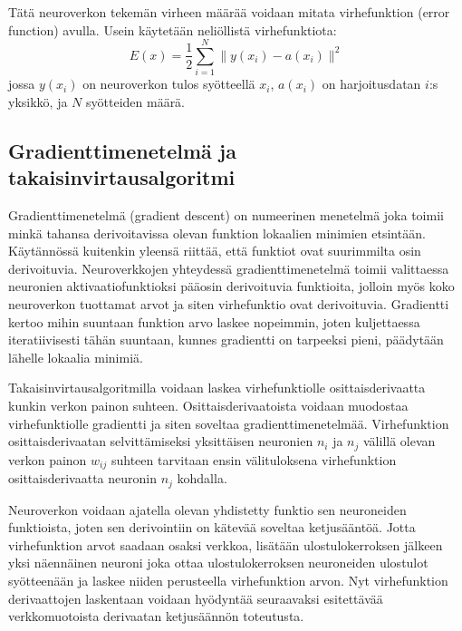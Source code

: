 \documentclass[finnish]{tktltiki2}
\theoremstyle{definition}
\theoremstyle{remark}
\begin{document}
  Tätä neuroverkon tekemän virheen määrää voidaan mitata virhefunktion (error function) avulla. Usein käytetään neliöllistä virhefunktiota:
    $$E(x) = \frac{1}{2} \sum_{i=1}^{N} \| y(x_i)-a(x_i) \|^2$$
  jossa $y(x_i)$ on neuroverkon tulos syötteellä $x_i$, $a(x_i)$ on harjoitusdatan $i$:s yksikkö, ja $N$ syötteiden määrä.




  \subsection{Gradienttimenetelmä ja takaisinvirtausalgoritmi}
  Gradienttimenetelmä (gradient descent) on numeerinen menetelmä joka toimii minkä tahansa derivoitavissa olevan funktion lokaalien minimien etsintään. Käytännössä kuitenkin yleensä riittää, että funktiot ovat suurimmilta osin derivoituvia. Neuroverkkojen yhteydessä gradienttimenetelmä toimii valittaessa neuronien aktivaatiofunktioksi pääosin derivoituvia funktioita, jolloin myös koko neuroverkon tuottamat arvot ja siten virhefunktio ovat derivoituvia. Gradientti kertoo mihin suuntaan funktion arvo laskee nopeimmin, joten kuljettaessa iteratiivisesti tähän suuntaan, kunnes gradientti on tarpeeksi pieni, päädytään lähelle lokaalia minimiä.

  Takaisinvirtausalgoritmilla voidaan laskea virhefunktiolle osittaisderivaatta kunkin verkon painon suhteen. Osittaisderivaatoista voidaan muodostaa virhefunktiolle gradientti ja siten soveltaa gradienttimenetelmää. Virhefunktion osittaisderivaatan selvittämiseksi yksittäisen neuronien $n_i$ ja $n_j$ välillä olevan verkon painon $w_{ij}$ suhteen  tarvitaan ensin välituloksena virhefunktion osittaisderivaatta neuronin $n_j$ kohdalla. 

  Neuroverkon voidaan ajatella olevan yhdistetty funktio sen neuroneiden funktioista, joten sen derivointiin on kätevää soveltaa ketjusääntöä. Jotta virhefunktion arvot saadaan osaksi verkkoa, lisätään ulostulokerroksen jälkeen yksi näennäinen neuroni joka ottaa ulostulokerroksen neuroneiden ulostulot syötteenään ja laskee niiden perusteella virhefunktion arvon. Nyt virhefunktion derivaattojen laskentaan voidaan hyödyntää seuraavaksi esitettävää verkkomuotoista derivaatan ketjusäännön toteutusta. 
    
\end{document}
